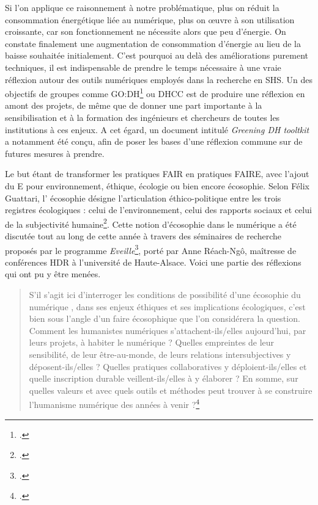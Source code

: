 \documentclass[a4paper,12pt,twoside]{book}
\begin{document}
Si l'on applique ce raisonnement à notre problématique, plus on réduit la consommation énergétique liée au numérique, plus on \oe{}uvre à son utilisation croissante, car son fonctionnement ne nécessite alors que peu d'énergie. On constate finalement une augmentation de consommation d'énergie au lieu de la baisse souhaitée initialement.
C'est pourquoi au delà des améliorations purement techniques, il est indispensable de prendre le temps nécessaire à une vraie réflexion autour des outils numériques employés dans la recherche en SHS. Un des objectifs de groupes comme GO:DH\footcite{godh} ou \acrshort{DHCC} est de produire une réflexion en amont des projets, de même que de donner une part importante à la sensibilisation et à la formation des ingénieurs et chercheurs de toutes les institutions à ces enjeux. A cet égard, un document intitulé \og \textit{Greening DH tooltkit} \fg a notamment été conçu, afin de poser les bases d'une réflexion commune sur de futures mesures à prendre.

Le but étant de transformer les pratiques FAIR en pratiques FAIRE, avec l'ajout du E pour environnement, éthique, écologie ou bien encore écosophie. Selon Félix Guattari, l' \og écosophie \fg{} désigne \og l'articulation éthico-politique entre les trois registres écologiques : celui de l'environnement, celui des rapports sociaux et celui de la subjectivité humaine\fg\footcite{guattari_les_2016}. Cette notion d'écosophie dans le numérique a été discutée tout au long de cette année à travers des séminaires de recherche proposés par le programme \textit{Eveille}\footcite{eveille}, porté par Anne Réach-Ngô, maîtresse de conférences HDR à l'université de Haute-Alsace. Voici une partie des réflexions qui ont pu y être menées.

\begin{quote}
    S'il s'agit ici d'interroger les conditions de possibilité d'une \og écosophie du numérique \fg, dans ses enjeux éthiques et ses implications écologiques, c'est bien sous l'angle d'un \og faire écosophique\fg{} que l'on considérera la question. Comment les humanistes numériques s'attachent-ils/elles aujourd'hui, par leurs projets, à \og habiter\fg{} le numérique ? Quelles empreintes de leur sensibilité, de leur être-au-monde, de leurs relations intersubjectives y déposent-ils/elles ? Quelles pratiques collaboratives y déploient-ils/elles et quelle inscription durable veillent-ils/elles à y élaborer ? En somme, sur quelles valeurs et avec quels outils et méthodes peut trouver à se construire l'humanisme numérique des années à venir ?\footcite{eveille}
\end{quote}
\end{document}
